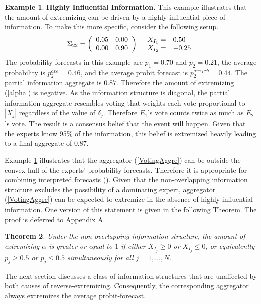 \documentclass[11pt]{article}
\newtheorem{theorem}{Theorem}[section]
\theoremstyle{definition}
\newtheorem{example}[theorem]{Example}
\theoremstyle{definition}
\begin{document}
\begin{example}
\label{KeyInfo}
\textbf{Highly Influential Information.} This example illustrates that the amount of extremizing can be driven by a highly influential piece of information. To make this more specific, consider the following setup.
\begin{align*}
\Sigma_{22} =  \left(\begin{array}{c c}
0.05 & 0.00\\
0.00 & 0.90 \\
 \end{array}\right)
  && 
  \begin{array}{l l}
X_{I_1} =& 0.50\\
X_{I_2} =& -0.25
 \end{array}
\end{align*}
The probability forecasts in this example are $p_1 = 0.70$ and $p_2 = 0.21$, the average probability is $p_2^{ave}  = 0.46$, and the average probit forecast is $p_2^{ave\ prb} = 0.44$.  The partial information aggregate is $0.87$. Therefore the amount of extremizing (\ref{alpha}) is negative. As the information structure is diagonal, the partial information aggregate resembles voting that weights each vote proportional to $|X_j|$ regardless of the value of $\delta_j$. Therefore $E_1$'s vote counts twice as much as $E_2$'s vote. The result is a consensus belief that the event will happen. Given that the experts know 95\% of the information, this belief is extremized heavily leading to a final aggregate of $0.87$. 
\end{example}

Example \ref{KeyInfo} illustrates that the aggregator (\ref{VotingAggre}) can be outside the convex hull of the experts' probability forecasts. Therefore it is appropriate for combining interpreted forecasts (\cite{parunak2013characterizing}). Given that the non-overlapping information structure excludes the possibility of a dominating expert, aggregator (\ref{VotingAggre}) can be expected to extremize in the absence of highly influential information. 
% 
One version of this statement is given in the following Theorem. The proof is deferred to Appendix A.
 \begin{theorem}
\label{positiveThmVote}
Under the non-overlapping information structure, the amount of extremizing $\alpha$ is greater or equal to $1$ if either $X_{I_j} \geq 0$ or  $X_{I_j} \leq 0$, or equivalently $p_j \geq 0.5$ or $p_j \leq 0.5$ simultaneously for all $j = 1, \dots, N$. 
\end{theorem}
The next section discusses a class of information structures that are unaffected by both causes of reverse-extremizing. Consequently, the corresponding aggregator always extremizes the average probit-forecast. 
\end{document}
